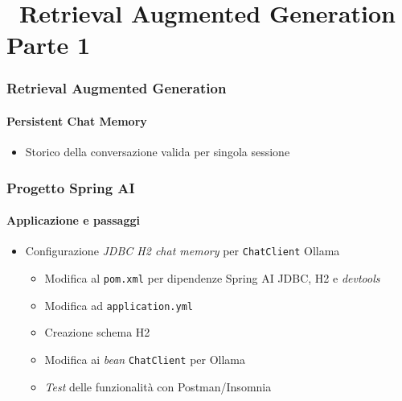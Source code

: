 \section{\faWrench\ Retrieval Augmented Generation\\{\small Parte 1}} %
\label{sec:spring-ai-rag-part-1}
%
\begin{frame}[t,fragile] \frametitle{Retrieval Augmented Generation}
    \framesubtitle{Persistent Chat Memory}
    {\footnotesize
    \begin{itemize}[leftmargin=10pt,align=right]
        \item[\alert{\faExclamationTriangle}] Storico della conversazione valida per singola sessione
    \end{itemize}
    }
\end{frame}
%
\begin{frame}[t,fragile] \frametitle{Progetto Spring AI}
    \framesubtitle{Applicazione e passaggi}
    {\small
    \begin{itemize}[leftmargin=10pt,align=right]
        \item[\alert{\faArrowCircleRight}] Configurazione \textit{JDBC H2 chat memory} per \texttt{ChatClient} Ollama
        \begin{itemize}[leftmargin=10pt,align=right]
            \item[\alertedcircled{1}] Modifica al \texttt{pom.xml} per dipendenze Spring AI JDBC, H2 e \textit{devtools}
            \item[\alertedcircled{2}] Modifica ad \texttt{application.yml}
            \item[\alertedcircled{3}] Creazione schema H2
            \item[\alertedcircled{4}] Modifica ai \textit{bean} \texttt{ChatClient} per Ollama
            \item[\alertedcircled{5}] \textit{Test} delle funzionalità con Postman/Insomnia
        \end{itemize}
    \end{itemize}
    }
\end{frame}
%
